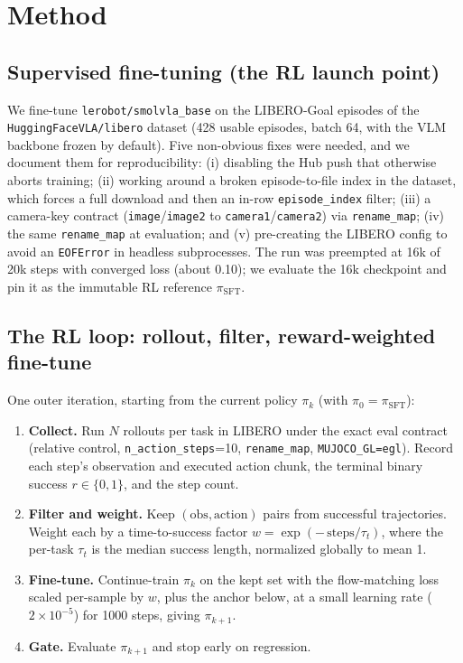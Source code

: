 \documentclass[11pt]{article}
\newcommand{\libgoal}{LIBERO-Goal}
\newcommand{\psft}{\pi_{\mathrm{SFT}}}
\begin{document}
\section{Method}
\label{sec:method}

\subsection{Supervised fine-tuning (the RL launch point)}
We fine-tune \texttt{lerobot/smolvla\_base} on the \libgoal{} episodes of the
\texttt{HuggingFaceVLA/libero} dataset (428 usable episodes, batch 64, with the VLM backbone frozen
by default). Five non-obvious fixes were needed, and we document them for reproducibility: (i)
disabling the Hub push that otherwise aborts training; (ii) working around a broken episode-to-file
index in the dataset, which forces a full download and then an in-row \texttt{episode\_index}
filter; (iii) a camera-key contract (\texttt{image}/\texttt{image2} to
\texttt{camera1}/\texttt{camera2}) via \texttt{rename\_map}; (iv) the same \texttt{rename\_map} at
evaluation; and (v) pre-creating the LIBERO config to avoid an \texttt{EOFError} in headless
subprocesses. The run was preempted at 16k of 20k steps with converged loss (about 0.10); we
evaluate the 16k checkpoint and pin it as the immutable RL reference $\psft$.

\subsection{The RL loop: rollout, filter, reward-weighted fine-tune}
One outer iteration, starting from the current policy $\pi_k$ (with $\pi_0=\psft$):
\begin{enumerate}\itemsep2pt
  \item \textbf{Collect.} Run $N$ rollouts per task in LIBERO under the exact eval contract
  (relative control, \texttt{n\_action\_steps}=10, \texttt{rename\_map}, \texttt{MUJOCO\_GL=egl}).
  Record each step's observation and executed action chunk, the terminal binary success
  $r\in\{0,1\}$, and the step count.
  \item \textbf{Filter and weight.} Keep $(\text{obs},\text{action})$ pairs from successful
  trajectories. Weight each by a time-to-success factor $w=\exp(-\,\text{steps}/\tau_t)$, where the
  per-task $\tau_t$ is the median success length, normalized globally to mean 1.
  \item \textbf{Fine-tune.} Continue-train $\pi_k$ on the kept set with the flow-matching loss
  scaled per-sample by $w$, plus the anchor below, at a small learning rate ($2\times 10^{-5}$) for
  1000 steps, giving $\pi_{k+1}$.
  \item \textbf{Gate.} Evaluate $\pi_{k+1}$ and stop early on regression.
\end{enumerate}
\end{document}
